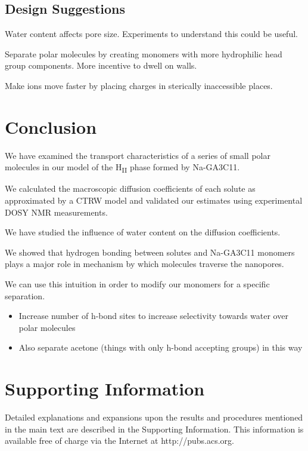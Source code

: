 \documentclass{article}
\begin{document}
  \subsection{Design Suggestions}

  Water content affects pore size. Experiments to understand this could be useful.

  Separate polar molecules by creating monomers with more hydrophilic head group components.
  More incentive to dwell on walls.

  Make ions move faster by placing charges in sterically inaccessible places. 

  \section{Conclusion}

  We have examined the transport characteristics of a series of small polar
  molecules in our model of the H\textsubscript{II} phase formed by 
  Na-GA3C11.

  We calculated the macroscopic diffusion coefficients of each solute as 
  approximated by a CTRW model and validated our estimates using experimental
  DOSY NMR measurements.

  We have studied the influence of water content on the diffusion coefficients.

  We showed that hydrogen bonding between solutes and Na-GA3C11 monomers plays
  a major role in mechanism by which molecules traverse the nanopores. 

  We can use this intuition in order to modify our monomers for a specific 
  separation.
  \begin{itemize}
	\item Increase number of h-bond sites to increase selectivity towards water 
	over polar molecules
	\item Also separate acetone (things with only h-bond accepting groups) in this way
  \end{itemize}
  
 
  \section*{Supporting Information}

  Detailed explanations and expansions upon the results and procedures mentioned in
  the main text are described in the Supporting Information. This information is
  available free of charge via the Internet at http://pubs.acs.org.
\end{document}
